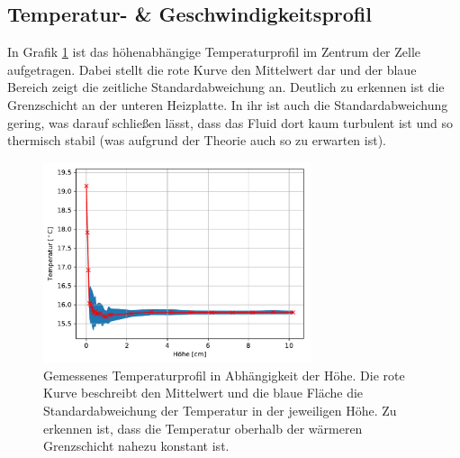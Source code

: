 \documentclass[12pt,a4paper,titlepage,headinclude]{scrartcl}
\numberwithin{equation}{subsection}
\begin{document}
\subsection{Temperatur- \& Geschwindigkeitsprofil}
\label{sec:profile}

In Grafik \ref{fig:temp_profil} ist das höhenabhängige Temperaturprofil im Zentrum der Zelle aufgetragen.
Dabei stellt die rote Kurve den Mittelwert dar und der blaue Bereich zeigt die zeitliche Standardabweichung an.
Deutlich zu erkennen ist die Grenzschicht an der unteren Heizplatte.
In ihr ist auch die Standardabweichung gering, was darauf schließen lässt, dass das Fluid dort kaum turbulent ist und so thermisch stabil (was aufgrund der Theorie auch so zu erwarten ist).
\begin{figure}[!ht]
\centering
\includegraphics[width=0.7\textwidth]{temp_profil}
\caption{Gemessenes Temperaturprofil in Abhängigkeit der Höhe. Die rote Kurve beschreibt den Mittelwert und die blaue Fläche die Standardabweichung der Temperatur in der jeweiligen Höhe. Zu erkennen ist, dass die Temperatur oberhalb der wärmeren Grenzschicht nahezu konstant ist.}
\label{fig:temp_profil}
\end{figure}
\end{document}
